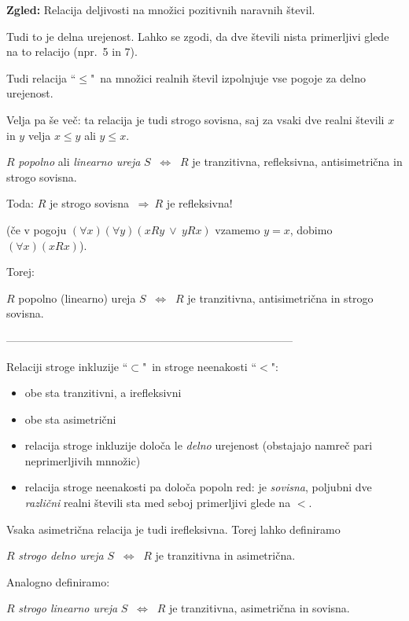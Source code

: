 \documentclass[11pt,paper=b5,footinclude,headinclude]{scrbook} %
\def\ali {{~\vee~}}
\def\sledi {{~\Rightarrow~}}
\def\cee {{~\Leftrightarrow~}}
\begin{document}
\medskip
\textbf{ Zgled:} Relacija deljivosti na množici pozitivnih naravnih števil.

Tudi to je delna urejenost. Lahko se zgodi, da dve števili nista primerljivi glede na to relacijo (npr.~5 in 7).

\bigskip
Tudi relacija ``$\le$"~na množici realnih števil izpolnjuje vse pogoje za delno urejenost.

Velja pa še več: ta relacija je tudi strogo sovisna, saj za vsaki dve realni števili $x$ in $y$ velja $x\le y$ ali $y\le x$.


\bigskip

$R$ {\em popolno} ali {\em linearno ureja} $S$ $\cee$ $R$ je tranzitivna, refleksivna,
antisimetrična in strogo sovisna.

\bigskip
Toda: $R$ je strogo sovisna $\sledi R$ je refleksivna!

(če v pogoju $(\forall x)(\forall y)(xRy \ali yRx)$ vzamemo $y = x$, dobimo
$(\forall x)(xRx)$).

Torej:

$R$ {popolno (linearno) ureja} $S$ $\cee$ $R$ je tranzitivna, antisimetrična in strogo sovisna.

\bigskip

------------------------------------------------------------------------------


\bigskip

\newpage
Relaciji stroge inkluzije ``$\subset$"~in stroge neenakosti ``$<$":
\begin{itemize}
  \item obe sta tranzitivni, a irefleksivni
  \item obe sta asimetrični
  \item relacija stroge inkluzije določa le {\em delno} urejenost (obstajajo namreč pari neprimerljivih mnnožic)
  \item relacija stroge neenakosti pa določa popoln red: je {\em sovisna}, poljubni dve {\em različni} realni števili sta med seboj primerljivi glede na $<$.
\end{itemize}

Vsaka asimetrična relacija je tudi irefleksivna. Torej lahko definiramo

$R$ {\em strogo delno ureja} $S$ $\cee$ $R$ je tranzitivna in asimetrična.

\bigskip

Analogno definiramo:

\medskip
$R$ {\em strogo linearno ureja} $S$ $\cee$ $R$ je tranzitivna, asimetrična in sovisna.
\end{document}
